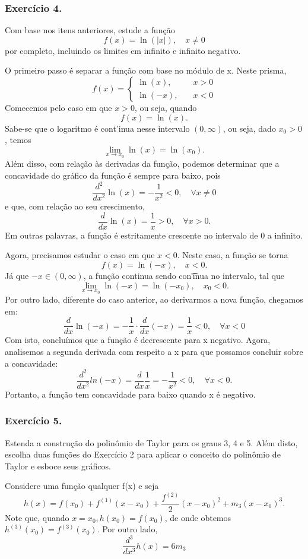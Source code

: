 \subsubsection{Exerc\'icio 4.} 
Com base nos itens anteriores, estude a fun\c c\~ao 
$$
f(x) = \ln(|x|), \quad x\neq{0}
$$
por completo, incluindo os limites em infinito e infinito negativo.

\begin{proof*}
O primeiro passo \'e separar a fun\c c\~ao com base no m\'odulo de x. Neste prisma,
$$
f(x) = \left\{\begin{array}{ll}
	\ln(x), \quad& x > 0\\
	\ln(-x), \quad& x < 0
\end{array}\right.
$$
Comecemos pelo caso em que $x > 0$, ou seja, quando
$$
f(x) = \ln(x).
$$
Sabe-se que o logaritmo \'e cont'inua nesse intervalo $(0, \infty)$, 
ou seja, dado $x_0 > 0$, temos
$$
\lim_{x\to{x_0}}\ln(x) = \ln(x_0).
$$
Al\'em disso, com rela\c c\~ao \`as derivadas da fun\c c\~ao, podemos determinar que a concavidade do 
gr\'afico da fun\c c\~ao \'e sempre para baixo, pois
$$
\frac{d^2}{dx^2}\ln(x) = -\frac{1}{x^2} < 0, \quad \forall x\neq0
$$
e que, com rela\c c\~ao ao seu crescimento,
$$
\frac{d}{dx}\ln(x) = \frac{1}{x} > 0, \quad \forall x > 0.
$$
Em outras palavras, a fun\c c\~ao \'e estritamente crescente no intervalo de 0 a infinito.

Agora, precisamos estudar o caso em que $x < 0$. Neste caso, a fun\c c\~ao se torna
$$
f(x) = \ln(-x), \quad x < 0.
$$
J\'a que $-x\in(0, \infty)$, a fun\c c\~ao continua sendo con\t'inua no intervalo, tal que
$$
\lim_{x\to{x_0}}\ln(-x) = \ln(-x_0), \quad x_0 < 0.
$$
Por outro lado, diferente do caso anterior, ao derivarmos a nova fun\c c\~ao, chegamos em:
$$
\frac{d}{dx}\ln(-x) = -\frac{1}{x}\cdot\frac{d}{dx}(-x) = \frac{1}{x} < 0, \quad \forall x < 0
$$
Com isto, conclu\'imos que a fun\c c\~ao \'e decrescente para x negativo. Agora, analisemos a 
segunda derivada com respeito a x para que possamos concluir sobre a concavidade:
$$
\frac{d^2}{d x^2}ln(-x) = \frac{d}{dx}\frac{1}{x} = -\frac{1}{x^2} < 0, \quad \forall x < 0. 
$$
Portanto, a fun\c c\~ao tem concavidade para baixo quando x \'e negativo.
\end{proof*}

\subsubsection{Exerc\'icio 5.}
Estenda a constru\c c\~ao do polin\^omio de Taylor para os graus 3, 4 e 5. Al\'em disto, escolha 
duas fun\c c\~oes do Exerc\'icio 2 para aplicar o conceito do polin\^omio de Taylor e esboce seus
gr\'aficos.
\begin{proof*}
	Considere uma fun\c c\~ao qualquer f(x) e seja 
$$
h(x) = f(x_0) + f^{(1)}(x-x_0) + \frac{f^{(2)}}{2}(x-x_0)^2 + m_3(x-x_0)^3.
$$
Note que, quando $x = x_0, h(x_0) = f(x_0)$, de onde obtemos $h^{(3)}(x_0) = f^{(3)}(x_0)$. Por outro
lado, 
$$
\frac{d^3}{dx^3}h(x) = 6m_3
$$
\end{proof*}

